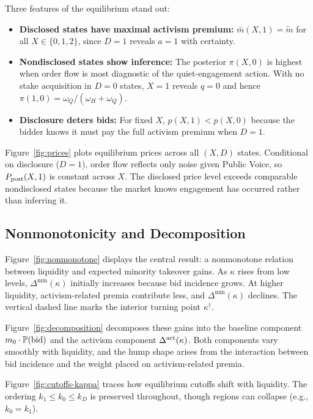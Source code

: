 \documentclass[11pt]{article}
\newcommand{\PP}{\mathbb{P}}
\newcommand{\1}{\mathbf{1}}
\begin{document}
Three features of the equilibrium stand out:
\begin{itemize}[leftmargin=2em,itemsep=2pt]
\item \textbf{Disclosed states have maximal activism premium:} $\bar{m}(X,1) = \tilde{m}$ for all $X \in \{0,1,2\}$, since $D=1$ reveals $a=1$ with certainty.
\item \textbf{Nondisclosed states show inference:} The posterior $\pi(X,0)$ is highest when order flow is most diagnostic of the quiet-engagement action. With no stake acquisition in $D=0$ states, $X=1$ reveals $q=0$ and hence $\pi(1,0)=\omega_Q/(\omega_H+\omega_Q)$.
\item \textbf{Disclosure deters bids:} For fixed $X$, $p(X,1) < p(X,0)$ because the bidder knows it must pay the full activism premium when $D=1$.
\end{itemize}

Figure~\ref{fig:prices} plots equilibrium prices across all $(X,D)$ states. Conditional on disclosure ($D=1$), order flow reflects only noise given Public Voice, so $P_{\textup{post}}(X,1)$ is constant across $X$. The disclosed price level exceeds comparable nondisclosed states because the market knows engagement has occurred rather than inferring it.

%
\subsection{Nonmonotonicity and Decomposition}
%

Figure~\ref{fig:nonmonotone} displays the central result: a nonmonotone relation between liquidity and expected minority takeover gains. As $\kappa$ rises from low levels, $\Delta^{\min}(\kappa)$ initially increases because bid incidence grows. At higher liquidity, activism-related premia contribute less, and $\Delta^{\min}(\kappa)$ declines. The vertical dashed line marks the interior turning point $\kappa^{\dagger}$.

Figure~\ref{fig:decomposition} decomposes these gains into the baseline component $m_0 \cdot \PP(\textup{bid})$ and the activism component $\Delta^{\textup{act}}(\kappa)$. Both components vary smoothly with liquidity, and the hump shape arises from the interaction between bid incidence and the weight placed on activism-related premia.

Figure~\ref{fig:cutoffs-kappa} traces how equilibrium cutoffs shift with liquidity. The ordering $k_1 \le k_0 \le k_D$ is preserved throughout, though regions can collapse (e.g., $k_0=k_1$).
\end{document}
